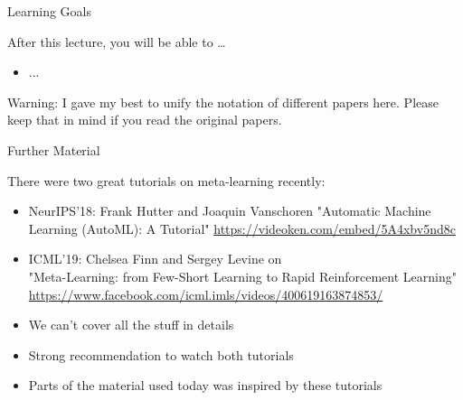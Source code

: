 \begin{frame}[c]{Learning Goals}

After this lecture, you will be able to \ldots

\begin{itemize}
	\item ...
\end{itemize}

\pause
\medskip
\alert{Warning:} I gave my best to unify the notation of different papers here. Please keep that in mind if you read the original papers.

\end{frame}
\begin{frame}[c]{Further Material}

There were two great tutorials on meta-learning recently:

\begin{itemize}
	\item NeurIPS'18: Frank Hutter and Joaquin Vanschoren
	"Automatic Machine Learning (AutoML): A Tutorial"
	\url{https://videoken.com/embed/5A4xbv5nd8c}
	\item ICML'19: Chelsea Finn and Sergey Levine on\\
	"Meta-Learning: from Few-Short Learning to Rapid Reinforcement Learning"\\
	\url{https://www.facebook.com/icml.imls/videos/400619163874853/}
\end{itemize}

\begin{itemize}
	\item We can't cover all the stuff in details
	\item Strong recommendation to watch both tutorials
	\item Parts of the material used today was inspired by these tutorials
\end{itemize}


\end{frame}
